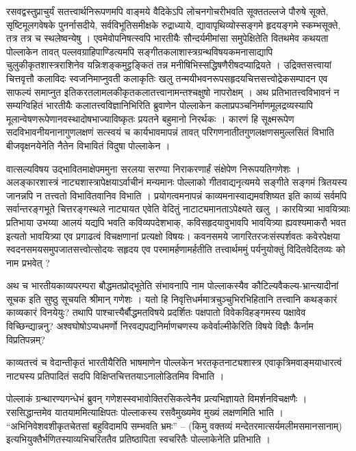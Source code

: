 {\dev रसवद्वस्तुप्राचुर्यं सतत्त्वार्थनिरूपणमपि वाङ्मये वैदिकेऽपि लोचनगोचरीभवति सूक्ततल्लजे पौरुषे सूक्ते, सृष्टिमूलगवेषके पुनर्नासदीये, सर्वविभूतिसमीक्षके रुद्राध्याये, द्यावापृथिव्योस्स\-ङ्गमे हृदयङ्गमे स्कम्भसूक्ते, तत्र तत्र च स्थलेष्वन्येषु । एवमेवोपनिषत्स्वपि भारतीयैः सौन्दर्य\-मीमांसा समुपेक्षितेति वितथमेव कथयता पोल्लाकेन तावत् पल्लवग्राहिपाण्डित्यमपि  सङ्गीतकलाशास्त्रग्रन्थविषयकमनासाद्यापि चुलुकीकृतशास्त्रराशिनेव यन्निःशङ्कमुट्टङ्कितं तन्न मनीषिभिस्सद्धिषणैरीषदप्याद्रियते । उद्रिक्तसत्त्वायां चित्तवृत्तौ कलाविदः स्वजनिमाप्नुवती कलाकृतिः खलु तन्मयीभवनरूपसहृदयचित्तसत्त्वोद्रेकसम्पादन एव साफल्यं समाप्नुत इति\break करतलामलकीकृतकलातत्त्वानामन्तश्चक्षुषो नापरोक्षम् । अथ प्रतिभातत्त्वविभावनं न सम्य\-ग्विहितं भारतीयैः कलातत्त्वविज्ञानिभिरिति ब्रुवाणेन पोल्लाकेन कलाप्रपञ्चनिर्माणमूलद्रव्य\-स्यापि मूलान्वेषणरूपेणानवस्थादोषभाज्याविष्कृतः प्रयतने बहुमानो निरर्थकः । कारणं हि सूक्ष्मरूपेण सदविभावनीयनानागुणलक्षणं सत्स्वयं च कार्यभावमापन्नं तावत् परिगणनातीत\-गुणलक्षणसमुल्लसितं विभाति बीजवृक्षनयेनेति नैतेन विभावितं विदुषा पोल्लाकेन ।}

{\dev वात्सल्यविषय उद्भावितमाक्षेपममुना सरलया सरण्या निराकरणार्हं संक्षेपेण निरूपयति\break गणेशः । अलङ्कारशास्त्रं नाट्यशास्त्रापेक्षयाऽर्वाचीनं मन्यमानः पोल्लाको गीतवाद्यनृत्यमये सङ्गीते सङ्गमं त्रितयस्य जानन्नपि न तत्त्वतो विभावितवानिव विभाति । प्रयोगत्वमनापन्नं काव्यमनास्वाद्यमव\-शिष्यत इति काव्यं सर्वमपि सर्वान्तरङ्गभूते चित्तरङ्गस्थले नाट्यायत एवेति वेदितुं नाटाट्यमानताऽपेक्ष्यते खलु । कारयित्र्या भावयित्र्याः प्रतिभाया उभय्या आलयं यद्यपि भवति कविव्यपदेशभाक्, कविसहृदयावुभावपि भावयित्र्या ह्यवश्यमाकरौ भवत इत्यतो भावयित्र्या एव प्रगाढत्वं विचक्षणानां प्रत्यक्षो विषयः। कवनसमये जागरितरजःसंस्पर्शवतः कवेरपेक्षया स्वदनसमयसमुपजातसत्त्वोत्सोदयः सहृदय एव परमामर्हणामर्हतीति तत्त्वार्थममुं पर्यनुयोक्तुं विदितवेदितव्यः को नाम प्रभवेत् ?}

{\dev अथ च भारतीयकाव्यपरम्परा बौद्धमतप्रोद्भूतेति संभावनापि नाम पोल्लाकस्यैव कौटिल्य\-वैकल्य-भ्रान्त्यादीनां सूचक इति सुष्ठु सूचयति श्रीमान् गणेशः । यतो हि निवृत्तिधर्ममात्रचुञ्चुभिरभि\-हितानि तत्त्वानि कथङ्कारं काव्यकारं विनयेयुः? तथापि पाश्चात्त्यैर्बौद्धमतविषये प्रदर्शितः पक्षपातो विवेकविहङ्गमस्य पक्षावेव विच्छिन्द्यान्ननु? अश्वघोषोऽप्यधमर्णो निरवद्यपद्य\-निर्माण\-चणस्य कवेर्वाल्मीकेरिति विषये विज्ञैः कैर्नाम विप्रतिपन्नम्?}

{\dev काव्यतत्त्वं च वेदान्तीकृतं भारतीयैरिति भाषमाणेन पोल्लकेन भरतकृतनाट्यशास्त्र एवाकृत्रिम\-वाङ्मयाधारत्वं नाट्यस्य प्रतिपादितं सदपि विक्षिप्तचित्ततयाऽनालोडितमिव विभाति ।}

{\dev पोल्लाकं ग्रन्थारण्यगन्धेभं ब्रुवन् गणेशस्स्वभावोक्तिरसिकत्वेनैव प्रत्यभिज्ञायते विमर्शन\-विच\-क्षणैः । रससिद्धान्तमेव यातयाममित्याक्षिपतः पोल्लाकस्य रसवैमुख्यमेव मुख्यं लक्षणमिति भाति । “अभिनिवेशवशीकृतचेतसां बहुविदामपि सम्भवति भ्रमः” – (किमु वक्तव्यं मन्देतरमात्सर्यमलीमसमानसानाम्) इत्यभियुक्तैर्भणितस्याव्यभिचरिततैव प्रतिष्ठापिता स्वचरितैः पोल्लाकेनेति प्रतिभाति ।}

